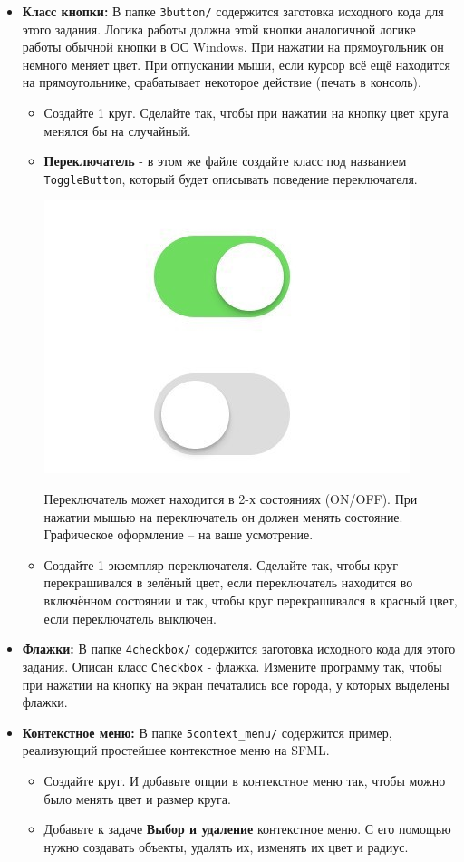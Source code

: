 \documentclass{article}
\begin{document}
\begin{itemize}
\item \textbf{Класс кнопки:} В папке \texttt{3button/} содержится заготовка исходного кода для этого задания.  Логика работы должна этой кнопки аналогичной логике работы обычной кнопки в ОС Windows. При нажатии на прямоугольник он немного меняет цвет. При отпускании мыши, если курсор всё ещё находится на прямоугольнике, срабатывает некоторое действие (печать в консоль).
	\begin{itemize}
	\item Создайте 1 круг. Сделайте так, чтобы при нажатии на кнопку цвет круга менялся бы на случайный.
	\item \textbf{Переключатель} - в этом же файле создайте класс под названием \texttt{ToggleButton}, который будет описывать поведение переключателя.
	\begin{center}
	\includegraphics[scale=0.15]{../images/toggle_button.jpeg}
	\end{center}
	Переключатель может находится в 2-х состояниях (ON/OFF). При нажатии мышью на переключатель он должен менять состояние. Графическое оформление -- на ваше усмотрение.
	\item Создайте 1 экземпляр переключателя. Сделайте так, чтобы круг перекрашивался в зелёный цвет, если переключатель находится во включённом состоянии и так, чтобы круг перекрашивался в красный цвет, если переключатель выключен.
	\end{itemize}
	
\newpage
\item \textbf{Флажки:} В папке \texttt{4checkbox/} содержится заготовка исходного кода для этого задания. Описан класс \texttt{Checkbox} - флажка. Измените программу так, чтобы при нажатии на кнопку на экран печатались все города, у которых выделены флажки.

\item \textbf{Контекстное меню:} В папке \texttt{5context\_menu/} содержится пример, реализующий простейшее контекстное меню на SFML.
\begin{itemize}
\item Создайте круг. И добавьте опции в контекстное меню так, чтобы можно было менять цвет и размер круга.
\item Добавьте к задаче \textbf{Выбор и удаление} контекстное меню. С его помощью нужно создавать объекты, удалять их, изменять их цвет и радиус.

\end{itemize}


\end{itemize}
\end{document}

